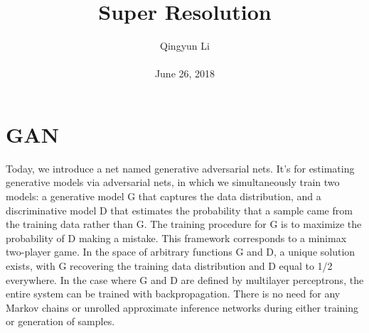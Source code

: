 \documentclass[10pt,twocolumn,letterpaper]{article}
\begin{document}
\author{Qingyun Li\\\\
June 26, 2018}        
\title{Super Resolution}

\maketitle

\section{GAN}
\par Today, we introduce a net named generative adversarial nets. It's for estimating generative models via adversarial nets, in which we simultaneously train two models: a generative model G that captures the data distribution, and a discriminative model D that estimates the probability that a sample came from the training data rather than G. The training procedure for G is to maximize the probability of D making a mistake. This framework corresponds to a minimax two-player game. In the space of arbitrary functions G and D, a unique solution exists, with G recovering the training data distribution and D equal to 1/2 everywhere. In the case where G and D are defined by multilayer perceptrons, the entire system can be trained with backpropagation. There is no need for any Markov chains or unrolled approximate inference networks during either training or generation of samples.
\end{document}
